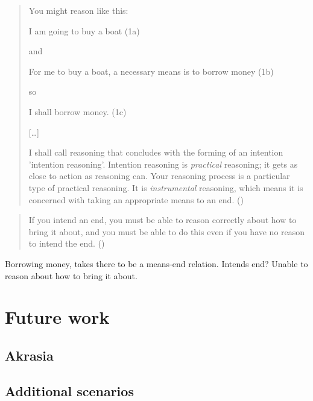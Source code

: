 \documentclass[10pt]{article}
\begin{document}
\begin{quote}
  You might reason like this:

  \mbox{}\quad I am going to buy a boat \hfill (1a)

  and

  \mbox{}\quad For me to buy a boat, a necessary means is to borrow money \hfill (1b)

  so

  \mbox{}\quad I shall borrow money. \hfill (1c)

  \begin{center}
    [\dots]
  \end{center}

  I shall call reasoning that concludes with the forming of an intention 'intention reasoning'.
  Intention reasoning is \emph{practical} reasoning; it gets as close to action as reasoning can.
  Your reasoning process is a particular type of practical reasoning.
  It is \emph{instrumental} reasoning, which means it is concerned with taking an appropriate means to an end.\nolinebreak
  \mbox{}\hfill\mbox{(\citeyear[86]{Broome:2002aa})}
\end{quote}

\begin{quote}
  If you intend an end, you must be able to reason correctly about how to bring it about, and you must be able to do this even if you have no reason to intend the end.\nolinebreak
  \mbox{}\hfill\mbox{(\citeyear[96]{Broome:2002aa})}
\end{quote}

Borrowing money, takes there to be a means-end relation.
Intends end?
Unable to reason about how to bring it about.

\newpage

\section{Future work}
\label{sec:future-work}

\subsection{Akrasia}
\label{sec:akrasia}

\subsection{Additional scenarios}
\label{sec:additional-scenarios}
\end{document}
